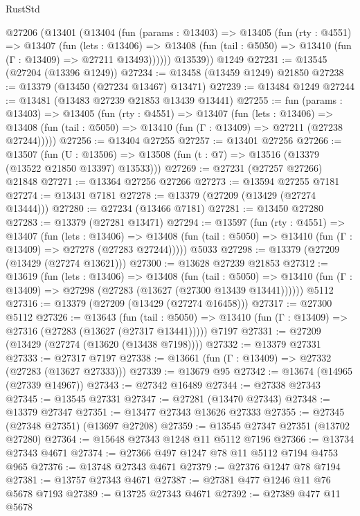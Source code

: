 \begin{lexlean}{RustStd}
\begin{coremodule}
    @27206
      (@13401
        (@13404
          (fun (params : @13403) =>
          @13405
            (fun (rty : @4551) =>
            @13407
              (fun (lets : @13406) =>
              @13408 (fun (tail : @5050) => @13410 (fun (Γ : @13409) => @27211 @13493))))))
        @13539))
    @1249
@27231 := @13545 (@27204 (@13396 @1249))
@27234 := @13458 (@13459 @1249) @21850
@27238 := @13379 (@13450 (@27234 @13467) @13471)
@27239 := @13484 @1249
@27244 := @13481 (@13483 @27239 @21853 @13439 @13441)
@27255 := fun (params : @13403) =>
  @13405
    (fun (rty : @4551) =>
    @13407
      (fun (lets : @13406) =>
      @13408 (fun (tail : @5050) => @13410 (fun (Γ : @13409) => @27211 (@27238 @27244)))))
@27256 := @13404 @27255
@27257 := @13401 @27256
@27266 := @13507
    (fun (U : @13506) => @13508 (fun (t : @7) => @13516 (@13379 (@13522 @21850 @13397) @13533)))
@27269 := @27231 (@27257 @27266) @21848
@27271 := @13364 @27256 @27266
@27273 := @13594 @27255 @7181
@27274 := @13431 @7181
@27278 := @13379 (@27209 (@13429 (@27274 @13444)))
@27280 := @27234 (@13466 @7181)
@27281 := @13450 @27280
@27283 := @13379 (@27281 @13471)
@27294 := @13597
    (fun (rty : @4551) =>
    @13407
      (fun (lets : @13406) =>
      @13408 (fun (tail : @5050) => @13410 (fun (Γ : @13409) => @27278 (@27283 @27244)))))
    @5033
@27298 := @13379 (@27209 (@13429 (@27274 @13621)))
@27300 := @13628 @27239 @21853
@27312 := @13619
    (fun (lets : @13406) =>
    @13408
      (fun (tail : @5050) =>
      @13410 (fun (Γ : @13409) => @27298 (@27283 (@13627 (@27300 @13439 @13441))))))
    @5112
@27316 := @13379 (@27209 (@13429 (@27274 @16458)))
@27317 := @27300 @5112
@27326 := @13643
    (fun (tail : @5050) => @13410 (fun (Γ : @13409) => @27316 (@27283 (@13627 (@27317 @13441)))))
    @7197
@27331 := @27209 (@13429 (@27274 (@13620 (@13438 @7198))))
@27332 := @13379 @27331
@27333 := @27317 @7197
@27338 := @13661 (fun (Γ : @13409) => @27332 (@27283 (@13627 @27333)))
@27339 := @13679 @95
@27342 := @13674 (@14965 (@27339 @14967))
@27343 := @27342 @16489
@27344 := @27338 @27343
@27345 := @13545 @27331
@27347 := @27281 (@13470 @27343)
@27348 := @13379 @27347
@27351 := @13477 @27343 @13626 @27333
@27355 := @27345 (@27348 @27351) (@13697 @27208)
@27359 := @13545 @27347 @27351 (@13702 @27280)
@27364 := @15648 @27343 @1248 @11 @5112 @7196
@27366 := @13734 @27343 @4671
@27374 := @27366 @497 @1247 @78 @11 @5112 @7194 @4753 @965
@27376 := @13748 @27343 @4671
@27379 := @27376 @1247 @78 @7194
@27381 := @13757 @27343 @4671
@27387 := @27381 @477 @1246 @11 @76 @5678 @7193
@27389 := @13725 @27343 @4671
@27392 := @27389 @477 @11 @5678

\end{coremodule}
\end{lexlean}
